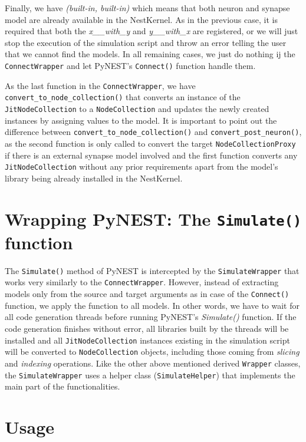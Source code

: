 Finally, we have \emph{(built-in, built-in)} which means that both neuron and synapse model are already available in the NestKernel. As in the previous case, it is required that both the \emph{x\_\_with\_y} and \emph{y\_\_with\_x} are registered, or we will just stop the execution of the simulation script and throw an error telling the user that we cannot find the models. In all remaining cases, we just do nothing ij the \texttt{ConnectWrapper} and let PyNEST's \texttt{Connect()} function handle them.

As the last function in the \texttt{ConnectWrapper}, we have \texttt{convert\_to\_node\_collection()} that converts an instance of the \texttt{JitNodeCollection} to a \texttt{NodeCollection} and updates the newly created instances by assigning values to the model. It is important to point out the difference between \texttt{convert\_to\_node\_collection()} and \texttt{convert\_post\_neuron()}, as the second function is only called to convert the target \texttt{NodeCollectionProxy} if there is an external synapse model involved and the first function converts any \texttt{JitNodeCollection} without any prior requirements apart from the model's library being already installed in the NestKernel.

\section{Wrapping PyNEST: The \texttt{Simulate()} function}

The \texttt{Simulate()} method of PyNEST is intercepted by the \texttt{SimulateWrapper} that works very similarly to the \texttt{ConnectWrapper}. However, instead of extracting models only from the source and target arguments as in case of the \texttt{Connect()} function, we apply the function to all models. In other words, we have to wait for all code generation threads before running PyNEST's \emph{Simulate()} function. If the code generation finishes without error, all libraries built by the threads will be installed and all \texttt{JitNodeCollection} instances existing in the simulation script will be converted to \texttt{NodeCollection} objects, including those coming from \emph{slicing} and \emph{indexing} operations. Like the other above mentioned derived \texttt{Wrapper} classes, the \texttt{SimulateWrapper} uses a helper class (\texttt{SimulateHelper}) that implements the main part of the functionalities.

\section{Usage}

